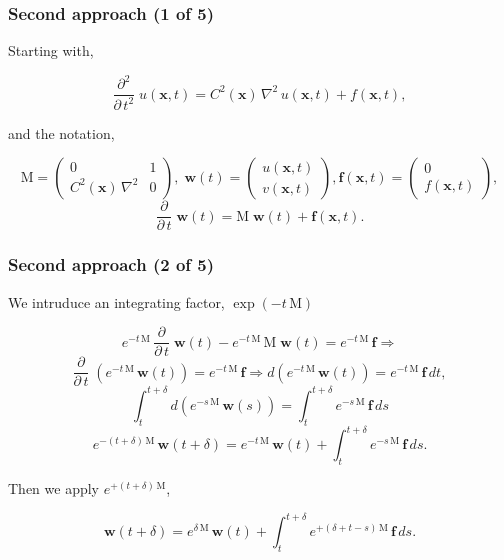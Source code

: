 \documentclass{beamer}
\newcommand{\twomat}[4]{ \left( \begin{array}{cc} #1 & #2 \\ #3 & #4  \end{array} \right) }
\newcommand{\twovec}[2]{ \left( \begin{array}{c} #1  \\ #2   \end{array} \right) }
\begin{document}
\begin{frame}
\frametitle{Second approach (1 of 5)}	
\begin{flushleft}
Starting with,
\end{flushleft}
\begin{equation*}
\frac{ \partial^2 }{ \partial \, t^2} \; u(\mathbf{x},t)  = C^2(\mathbf{x}) \, \nabla^2 \, u(\mathbf{x},t) + f(\mathbf{x},t),
\end{equation*}
\begin{flushleft}
and the notation,
\end{flushleft}
\begin{equation*}
\textrm{M} = \twomat{0}{1}{ C^2(\mathbf{x}) \, \nabla^2 }{0}, \; \textbf{w}(t) = \twovec{ u(\mathbf{x},t) }{ v(\mathbf{x},t) }, \mathbf{f}(\mathbf{x},t) =  \twovec{0}{f(\mathbf{x},t)},
\end{equation*}
\begin{equation*}
\frac{ \partial }{ \partial \, t} \; \textbf{w}(t)  = \textrm{M} \; \textbf{w}(t) + \textbf{f}(\mathbf{x},t).
\end{equation*}
\end{frame}

\begin{frame}
\frametitle{Second approach (2 of 5)}	
\begin{flushleft}
We intruduce an integrating factor, $\exp{(-t \, \textrm{M})}$
\end{flushleft}
\begin{equation*}
e^{-t \, \textrm{M}} \, \frac{ \partial }{ \partial \, t} \; \textbf{w}(t)  - e^{-t \, \textrm{M}} \, \textrm{M} \; \textbf{w}(t) = e^{-t \, \textrm{M}} \, \textbf{f} \Rightarrow
\end{equation*}
\begin{equation*}
\frac{ \partial }{ \partial \, t} \;  \left( e^{-t \, \textrm{M}} \, \textbf{w}(t) \right) = e^{-t \, \textrm{M}} \, \textbf{f} \Rightarrow  d \left( e^{-t \, \textrm{M}} \, \textbf{w}(t) \right) = e^{-t \, \textrm{M}} \, \textbf{f} \, dt,
\end{equation*}
\begin{equation*}
\int_t^{t+\delta} d \left( e^{-s \, \textrm{M}} \, \textbf{w}(s) \right) =  \int_t^{t+\delta}  e^{-s \, \textrm{M}} \, \textbf{f} \, ds
\end{equation*}
\begin{equation*}
 e^{-(t+\delta) \, \textrm{M}} \, \textbf{w}(t+\delta)  = e^{-t \, \textrm{M}} \, \textbf{w}(t) + \int_t^{t+\delta}  e^{-s \, \textrm{M}} \, \textbf{f} \, ds.
\end{equation*}
\begin{flushleft}
Then we apply $ e^{+(t+\delta) \, \textrm{M}}$,
\end{flushleft}
\begin{equation*}
\textbf{w}(t+\delta)  = e^{\delta \, \textrm{M}} \, \textbf{w}(t) + \int_t^{t+\delta}  e^{+(\delta+t-s) \, \textrm{M}} \, \textbf{f} \, ds.
\end{equation*}
\end{frame}
\end{document}
